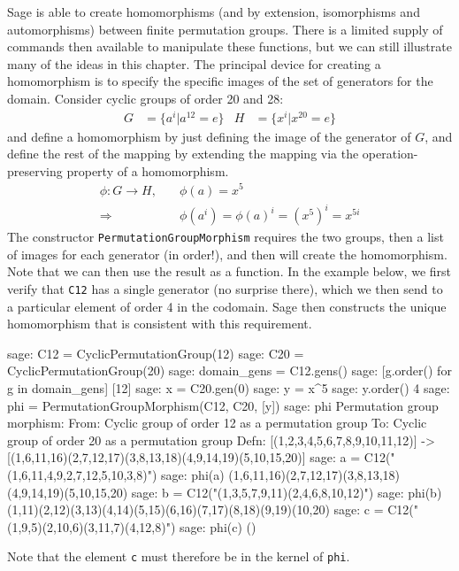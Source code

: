 Sage is able to create homomorphisms (and by extension, isomorphisms and automorphisms) between finite permutation groups.  There is a limited supply of commands then available to manipulate these functions, but we can still illustrate many of the ideas in this chapter.
%
%
The principal device for creating a homomorphism is to specify the specific images of the set of generators for the domain.  Consider cyclic groups of order 20 and 28:
%
\begin{align*}
G &= \{a^i\vert a^{12}=e\}
&
H &= \{x^i\vert x^{20}=e\}
\end{align*}
%
and define a homomorphism by just defining the image of the generator of $G$, and define the rest of the mapping by extending the mapping via the operation-preserving property of a homomorphism.
%
\begin{align*}
\phi: G\rightarrow H, &\quad\phi(a)=x^5\\
\Rightarrow           &\quad\phi(a^i) = \phi(a)^i = (x^5)^i = x ^{5i}
\end{align*}
%
The constructor \verb?PermutationGroupMorphism? requires the two groups, then a list of images for each generator (in order!), and then will create the homomorphism.  Note that we can then use the result as a function.  In the example below, we first verify that \verb?C12? has a single generator (no surprise there), which we then send to a particular element of order 4 in the codomain.  Sage then constructs the unique homomorphism that is consistent with this requirement.
%
\begin{sageexample}
sage: C12 = CyclicPermutationGroup(12)
sage: C20 = CyclicPermutationGroup(20)
sage: domain_gens = C12.gens()
sage: [g.order() for g in domain_gens]
[12]
sage: x = C20.gen(0)
sage: y = x^5
sage: y.order()
4
sage: phi = PermutationGroupMorphism(C12, C20, [y])
sage: phi
Permutation group morphism:
  From: Cyclic group of order 12 as a permutation group
  To:   Cyclic group of order 20 as a permutation group
  Defn: [(1,2,3,4,5,6,7,8,9,10,11,12)] ->
        [(1,6,11,16)(2,7,12,17)(3,8,13,18)(4,9,14,19)(5,10,15,20)]
sage: a = C12("(1,6,11,4,9,2,7,12,5,10,3,8)")
sage: phi(a)
(1,6,11,16)(2,7,12,17)(3,8,13,18)(4,9,14,19)(5,10,15,20)
sage: b = C12("(1,3,5,7,9,11)(2,4,6,8,10,12)")
sage: phi(b)
(1,11)(2,12)(3,13)(4,14)(5,15)(6,16)(7,17)(8,18)(9,19)(10,20)
sage: c = C12("(1,9,5)(2,10,6)(3,11,7)(4,12,8)")
sage: phi(c)
()
\end{sageexample}
%
Note that the element \verb?c? must therefore be in the kernel of \verb?phi?.\par

